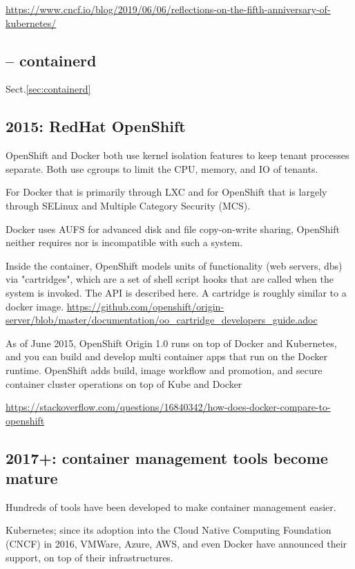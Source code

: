 \url{https://www.cncf.io/blog/2019/06/06/reflections-on-the-fifth-anniversary-of-kubernetes/}

\subsection{-- containerd}

Sect.\ref{sec:containerd}


\subsection{2015: RedHat OpenShift}
\label{sec:OpenShift}

OpenShift and Docker both use kernel isolation features to keep tenant processes separate.
Both use cgroups to limit the CPU, memory, and IO of tenants.

For Docker that is primarily through LXC and for OpenShift that is largely
through SELinux and Multiple Category Security (MCS).

Docker uses AUFS for advanced disk and file copy-on-write sharing, OpenShift
neither requires nor is incompatible with such a system.

Inside the container, OpenShift models units of functionality (web servers, dbs)
via "cartridges", which are a set of shell script hooks that are called when the
system is invoked. The API is described here. A cartridge is roughly similar to a docker image.
\url{https://github.com/openshift/origin-server/blob/master/documentation/oo_cartridge_developers_guide.adoc}

As of June 2015, OpenShift Origin 1.0 runs on top of Docker and Kubernetes, and
you can build and develop multi container apps that run on the Docker runtime.
OpenShift adds build, image workflow and promotion, and secure container cluster
operations on top of Kube and Docker

\url{https://stackoverflow.com/questions/16840342/how-does-docker-compare-to-openshift}

\subsection{2017+: container management tools become mature}

Hundreds of tools have been developed to make container management easier.


Kubernetes; since its adoption into the Cloud Native Computing Foundation (CNCF)
in 2016, VMWare, Azure, AWS, and even Docker have announced their support, on
top of their infrastructures.

